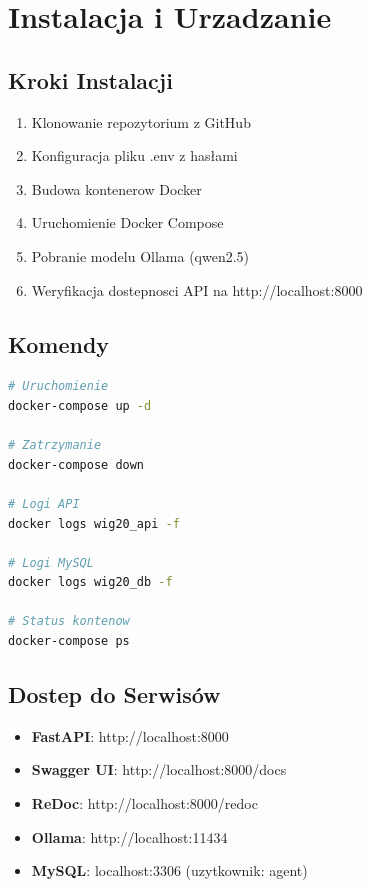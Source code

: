 \documentclass[11pt,a4paper]{article}
\begin{document}
\section{Instalacja i Urzadzanie}

\subsection{Kroki Instalacji}

\begin{enumerate}
    \item Klonowanie repozytorium z GitHub
    \item Konfiguracja pliku .env z hasłami
    \item Budowa kontenerow Docker
    \item Uruchomienie Docker Compose
    \item Pobranie modelu Ollama (qwen2.5)
    \item Weryfikacja dostepnosci API na http://localhost:8000
\end{enumerate}

\subsection{Komendy}

\begin{lstlisting}[language=bash]
# Uruchomienie
docker-compose up -d

# Zatrzymanie
docker-compose down

# Logi API
docker logs wig20_api -f

# Logi MySQL
docker logs wig20_db -f

# Status kontenow
docker-compose ps
\end{lstlisting}

\subsection{Dostep do Serwisów}

\begin{itemize}
    \item \textbf{FastAPI}: http://localhost:8000
    \item \textbf{Swagger UI}: http://localhost:8000/docs
    \item \textbf{ReDoc}: http://localhost:8000/redoc
    \item \textbf{Ollama}: http://localhost:11434
    \item \textbf{MySQL}: localhost:3306 (uzytkownik: agent)
\end{itemize}
\end{document}
